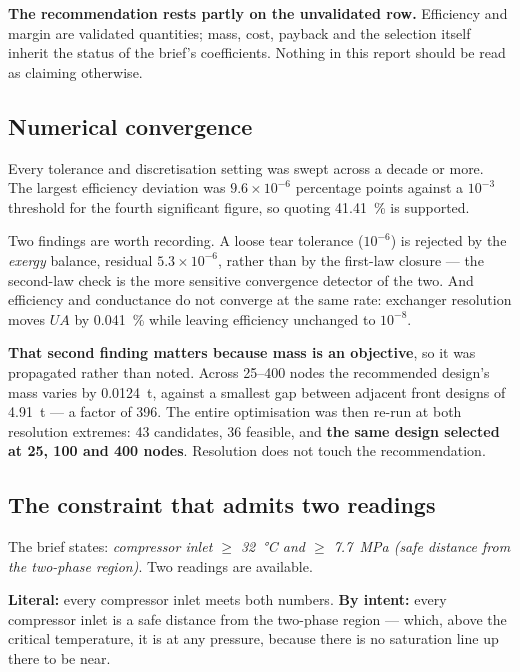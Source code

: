\textbf{The recommendation rests partly on the unvalidated row.}
Efficiency and margin are validated quantities; mass, cost, payback and
the selection itself inherit the status of the brief's coefficients.
Nothing in this report should be read as claiming otherwise.

\subsection{Numerical convergence}

Every tolerance and discretisation setting was swept across a decade or
more. The largest efficiency deviation was
$9.6\times10^{-6}$ percentage points against a $10^{-3}$ threshold for
the fourth significant figure, so quoting \SI{41.41}{\percent} is
supported.

Two findings are worth recording. A loose tear tolerance
($10^{-6}$) is rejected by the \emph{exergy} balance, residual
$5.3\times10^{-6}$, rather than by the first-law closure --- the
second-law check is the more sensitive convergence detector of the two.
And efficiency and conductance do not converge at the same rate:
exchanger resolution moves $UA$ by \SI{0.041}{\percent} while leaving
efficiency unchanged to $10^{-8}$.

\textbf{That second finding matters because mass is an objective}, so
it was propagated rather than noted. Across \numrange{25}{400} nodes
the recommended design's mass varies by \SI{0.0124}{\tonne}, against a
smallest gap between adjacent front designs of \SI{4.91}{\tonne} --- a
factor of \num{396}. The entire optimisation was then re-run at both
resolution extremes: \num{43} candidates, \num{36} feasible, and
\textbf{the same design selected at \num{25}, \num{100} and \num{400}
nodes}. Resolution does not touch the recommendation.

\subsection{The constraint that admits two readings}
\label{r:sec:ambiguity}

The brief states: \emph{compressor inlet $\ge$ \SI{32}{\celsius} and
$\ge$ \SI{7.7}{\mega\pascal} (safe distance from the two-phase
region)}. Two readings are available.

\textbf{Literal:} every compressor inlet meets both numbers.
\textbf{By intent:} every compressor inlet is a safe distance from the
two-phase region --- which, above the critical temperature, it is at any
pressure, because there is no saturation line up there to be near.

